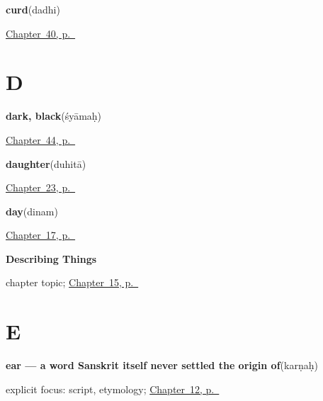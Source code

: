 \noindent\begin{minipage}[t]{\linewidth}
\raggedright
\textbf{curd}\enspace\emph{}\enspace(dadhi)\par
\footnotesize \hyperref[ch:sa-in-the-kitchen]{Chapter~40, p.~\pageref*{ch:sa-in-the-kitchen}}
\end{minipage}\par\smallskip

\section*{D}

\noindent\begin{minipage}[t]{\linewidth}
\raggedright
\textbf{dark, black}\enspace\emph{}\enspace(śyāmaḥ)\par
\footnotesize \hyperref[ch:sa-colours]{Chapter~44, p.~\pageref*{ch:sa-colours}}
\end{minipage}\par\smallskip

\noindent\begin{minipage}[t]{\linewidth}
\raggedright
\textbf{daughter}\enspace\emph{}\enspace(duhitā)\par
\footnotesize \hyperref[ch:sa-kinship]{Chapter~23, p.~\pageref*{ch:sa-kinship}}
\end{minipage}\par\smallskip

\noindent\begin{minipage}[t]{\linewidth}
\raggedright
\textbf{day}\enspace\emph{}\enspace(dinam)\par
\footnotesize \hyperref[ch:sa-time]{Chapter~17, p.~\pageref*{ch:sa-time}}
\end{minipage}\par\smallskip

\noindent\begin{minipage}[t]{\linewidth}
\raggedright
\textbf{Describing Things}\par
\footnotesize chapter topic; \hyperref[ch:sa-describing-things]{Chapter~15, p.~\pageref*{ch:sa-describing-things}}
\end{minipage}\par\smallskip

\section*{E}

\noindent\begin{minipage}[t]{\linewidth}
\raggedright
\textbf{ear — a word Sanskrit itself never settled the origin of}\enspace\emph{}\enspace(karṇaḥ)\par
\footnotesize explicit focus: script, etymology; \hyperref[ch:sa-face-nouns-1]{Chapter~12, p.~\pageref*{ch:sa-face-nouns-1}}
\end{minipage}\par\smallskip


